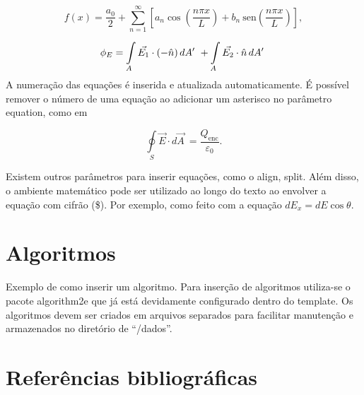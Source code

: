 \begin{equation}
    \label{eq:equacao-exemplo1}
    f(x) = \frac{a_0}{2} + \sum_{n=1}^{\infty} \left[a_n \cos{ \left( \frac{ n\pi x}{L} \right) }  +  b_n  \: \mathrm{sen}{ \left( \frac{ n\pi x}{L} \right) }     \right]
    ,
\end{equation}

\begin{align}
    \phi_E  = \int \limits_{A} \Vec{E_1}\cdot (-\Hat{n}) \, dA'\ + \int \limits_{A} \Vec{E_2}\cdot \Hat{n} \, dA'\
    \label{eq:equacao-exemplo2}
\end{align}
\noindent
A numeração das equações é inserida e atualizada automaticamente. É possível remover o número de uma equação ao adicionar um asterisco no parâmetro  {\ttfamily equation}, como em

\begin{equation*}
    \oint \limits_S \Vec{E}\cdot d \Vec{A}\ =
    \frac{Q_{\mathrm{enc}}}{\varepsilon_0}
    .
\end{equation*}

Existem outros parâmetros para inserir equações, como o {\ttfamily align},  {\ttfamily split}.
Além disso, o ambiente matemático pode ser utilizado ao longo do texto ao envolver a equação com cifrão (\$). Por exemplo, como feito com a equação $ dE_x = dE \cos\theta $.

\section{Algoritmos}
\label{sec:algoritmos}

Exemplo de como inserir um algoritmo. Para inserção de algoritmos utiliza-se o pacote {\ttfamily algorithm2e} que já está devidamente configurado dentro do template.
Os algoritmos devem ser criados em arquivos separados para facilitar manutenção e armazenados no diretório de ``/dados''. \\


\section{Referências bibliográficas}
\label{sec:referenciasBibliograficas}

